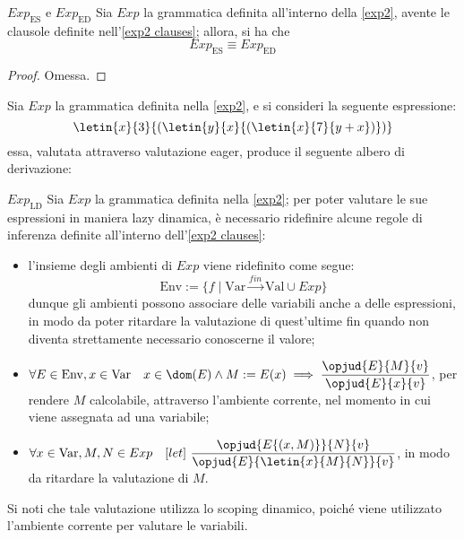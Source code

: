 \documentclass[a4paper, 12pt]{report}
\begin{document}
    \begin{framedlem}{$Exp_\mathrm{ES}$ e $Exp_\mathrm{ED}$}
        Sia $Exp$ la grammatica definita all'interno della \cref{exp2}, avente le clausole definite nell'\cref{exp2 clauses}; allora, si ha che $$Exp_\mathrm{ES} \equiv Exp_\mathrm{ED}$$
    \end{framedlem}

    \begin{proof}
        Omessa.
    \end{proof}

    \begin{example}
        \label{eager2}
        Sia $Exp$ la grammatica definita nella \cref{exp2}, e si consideri la seguente espressione: $$\letin{x}{3}{(\letin{y}{x}{(\letin{x}{7}{y + x})})}$$ essa, valutata attraverso valutazione eager, produce il seguente albero di derivazione: 
    \end{example}

    \begin{framedprop}{$Exp_\mathrm{LD}$}
        Sia $Exp$ la grammatica definita nella \cref{exp2}; per poter valutare le sue espressioni in maniera lazy dinamica, è necessario ridefinire alcune regole di inferenza definite all'interno dell'\cref{exp2 clauses}:

        \begin{itemize}
            \item l'insieme degli ambienti di $Exp$ viene ridefinito come segue: $$\mathrm{Env} := \{f \mid \mathrm{Var} \xrightarrow{fin} \mathrm{Val} \cup Exp\}$$ dunque gli ambienti possono associare delle variabili anche a delle espressioni, in modo da poter ritardare la valutazione di quest'ultime fin quando non diventa strettamente necessario conoscerne il valore;
            \item $\forall E \in \mathrm{Env}, x \in \mathrm{Var} \quad x \in \dom(E) \land M := E(x) \implies \dfrac{\opjud{E}{M}{v}}{\opjud{E}{x}{v}}$, per rendere $M$ calcolabile, attraverso l'ambiente corrente, nel momento in cui viene assegnata ad una variabile;
            \item $\forall x \in \mathrm{Var}, M, N \in Exp \quad [let] \ \dfrac{\opjud{E\{(x, M)\}}{N}{v}}{\opjud{E}{\letin{x}{M}{N}}{v}}$, in modo da ritardare la valutazione di $M$.
        \end{itemize}

        Si noti che tale valutazione utilizza lo scoping dinamico, poiché viene utilizzato l'ambiente corrente per valutare le variabili.
    \end{framedprop}
\end{document}
